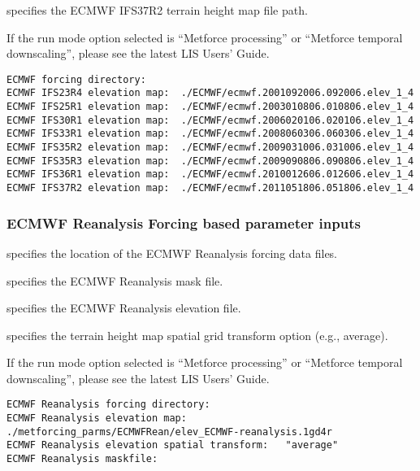   specifies the ECMWF IFS37R2
 terrain height map file path.


 If the run mode option selected is ``Metforce processing'' or
 ``Metforce temporal downscaling'', please see the latest LIS Users'
 Guide.

 

 \begin{Verbatim}[frame=single]
ECMWF forcing directory:
ECMWF IFS23R4 elevation map:  ./ECMWF/ecmwf.2001092006.092006.elev_1_4
ECMWF IFS25R1 elevation map:  ./ECMWF/ecmwf.2003010806.010806.elev_1_4
ECMWF IFS30R1 elevation map:  ./ECMWF/ecmwf.2006020106.020106.elev_1_4
ECMWF IFS33R1 elevation map:  ./ECMWF/ecmwf.2008060306.060306.elev_1_4
ECMWF IFS35R2 elevation map:  ./ECMWF/ecmwf.2009031006.031006.elev_1_4
ECMWF IFS35R3 elevation map:  ./ECMWF/ecmwf.2009090806.090806.elev_1_4
ECMWF IFS36R1 elevation map:  ./ECMWF/ecmwf.2010012606.012606.elev_1_4
ECMWF IFS37R2 elevation map:  ./ECMWF/ecmwf.2011051806.051806.elev_1_4
 \end{Verbatim}

 
 \subsubsection{ECMWF Reanalysis Forcing based parameter inputs}

  specifies the
 location of the ECMWF Reanalysis forcing data files.

  specifies the ECMWF Reanalysis
 mask file.

  specifies the ECMWF Reanalysis  
 elevation file.  

  specifies 
  the terrain height map spatial grid transform option (e.g., average).

 If the run mode option selected is ``Metforce processing'' or
 ``Metforce temporal downscaling'', please see the latest LIS Users'
 Guide.

 

 \begin{Verbatim}[frame=single]
ECMWF Reanalysis forcing directory:
ECMWF Reanalysis elevation map: ./metforcing_parms/ECMWFRean/elev_ECMWF-reanalysis.1gd4r
ECMWF Reanalysis elevation spatial transform:   "average"
ECMWF Reanalysis maskfile:
 \end{Verbatim}


